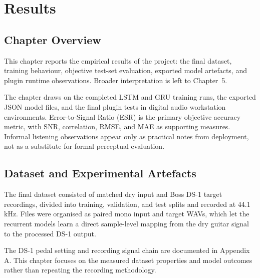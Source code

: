 \chapter{Results}
\label{chap:results}

\section{Chapter Overview}
\label{sec:results-overview}

This chapter reports the empirical results of the project: the final dataset, training behaviour, objective test-set evaluation, exported model artefacts, and plugin runtime observations. Broader interpretation is left to Chapter~5.

The chapter draws on the completed LSTM and GRU training runs, the exported JSON model files, and the final plugin tests in digital audio workstation environments. Error-to-Signal Ratio (ESR) is the primary objective accuracy metric, with SNR, correlation, RMSE, and MAE as supporting measures. Informal listening observations appear only as practical notes from deployment, not as a substitute for formal perceptual evaluation.

\section{Dataset and Experimental Artefacts}
\label{sec:dataset-and-experimental-artefacts}

The final dataset consisted of matched dry input and Boss DS-1 target recordings, divided into training, validation, and test splits and recorded at 44.1 kHz. Files were organised as paired mono input and target WAVs, which let the recurrent models learn a direct sample-level mapping from the dry guitar signal to the processed DS-1 output.

The DS-1 pedal setting and recording signal chain are documented in Appendix A. This chapter focuses on the measured dataset properties and model outcomes rather than repeating the recording methodology.

